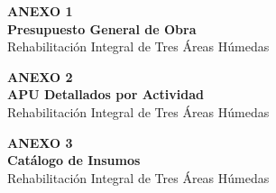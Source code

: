﻿\documentclass[12pt]{article}
\begin{document}
%
%
\newpage
\thispagestyle{plain}
\vspace*{\fill}
\begin{center}
{\Huge\bfseries\color{primary}\lsstyle ANEXO 1}\\[1.2cm]
{\LARGE\bfseries\color{secondary} Presupuesto General de Obra}\\[0.6cm]
{\large\color{primary!70!black} Rehabilitación Integral de Tres Áreas Húmedas}
\end{center}
\vspace*{\fill}
\newpage

%
\newpage
\thispagestyle{plain}
\vspace*{\fill}
\begin{center}
{\Huge\bfseries\color{primary}\lsstyle ANEXO 2}\\[1.2cm]
{\LARGE\bfseries\color{secondary} APU Detallados por Actividad}\\[0.6cm]
{\large\color{primary!70!black} Rehabilitación Integral de Tres Áreas Húmedas}
\end{center}
\vspace*{\fill}
\newpage

%
\newpage
\thispagestyle{plain}
\vspace*{\fill}
\begin{center}
{\Huge\bfseries\color{primary}\lsstyle ANEXO 3}\\[1.2cm]
{\LARGE\bfseries\color{secondary} Catálogo de Insumos}\\[0.6cm]
{\large\color{primary!70!black} Rehabilitación Integral de Tres Áreas Húmedas}
\end{center}
\vspace*{\fill}
\newpage

%
\newpage
\thispagestyle{plain}
\end{document}
